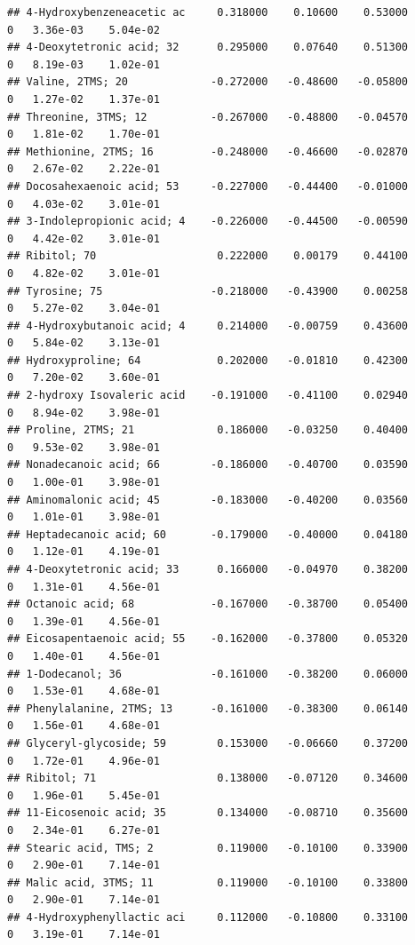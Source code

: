 \documentclass[]{article}
\begin{document}
\begin{verbatim}
## 4-Hydroxybenzeneacetic ac     0.318000    0.10600    0.53000         0   3.36e-03    5.04e-02
## 4-Deoxytetronic acid; 32      0.295000    0.07640    0.51300         0   8.19e-03    1.02e-01
## Valine, 2TMS; 20             -0.272000   -0.48600   -0.05800         0   1.27e-02    1.37e-01
## Threonine, 3TMS; 12          -0.267000   -0.48800   -0.04570         0   1.81e-02    1.70e-01
## Methionine, 2TMS; 16         -0.248000   -0.46600   -0.02870         0   2.67e-02    2.22e-01
## Docosahexaenoic acid; 53     -0.227000   -0.44400   -0.01000         0   4.03e-02    3.01e-01
## 3-Indolepropionic acid; 4    -0.226000   -0.44500   -0.00590         0   4.42e-02    3.01e-01
## Ribitol; 70                   0.222000    0.00179    0.44100         0   4.82e-02    3.01e-01
## Tyrosine; 75                 -0.218000   -0.43900    0.00258         0   5.27e-02    3.04e-01
## 4-Hydroxybutanoic acid; 4     0.214000   -0.00759    0.43600         0   5.84e-02    3.13e-01
## Hydroxyproline; 64            0.202000   -0.01810    0.42300         0   7.20e-02    3.60e-01
## 2-hydroxy Isovaleric acid    -0.191000   -0.41100    0.02940         0   8.94e-02    3.98e-01
## Proline, 2TMS; 21             0.186000   -0.03250    0.40400         0   9.53e-02    3.98e-01
## Nonadecanoic acid; 66        -0.186000   -0.40700    0.03590         0   1.00e-01    3.98e-01
## Aminomalonic acid; 45        -0.183000   -0.40200    0.03560         0   1.01e-01    3.98e-01
## Heptadecanoic acid; 60       -0.179000   -0.40000    0.04180         0   1.12e-01    4.19e-01
## 4-Deoxytetronic acid; 33      0.166000   -0.04970    0.38200         0   1.31e-01    4.56e-01
## Octanoic acid; 68            -0.167000   -0.38700    0.05400         0   1.39e-01    4.56e-01
## Eicosapentaenoic acid; 55    -0.162000   -0.37800    0.05320         0   1.40e-01    4.56e-01
## 1-Dodecanol; 36              -0.161000   -0.38200    0.06000         0   1.53e-01    4.68e-01
## Phenylalanine, 2TMS; 13      -0.161000   -0.38300    0.06140         0   1.56e-01    4.68e-01
## Glyceryl-glycoside; 59        0.153000   -0.06660    0.37200         0   1.72e-01    4.96e-01
## Ribitol; 71                   0.138000   -0.07120    0.34600         0   1.96e-01    5.45e-01
## 11-Eicosenoic acid; 35        0.134000   -0.08710    0.35600         0   2.34e-01    6.27e-01
## Stearic acid, TMS; 2          0.119000   -0.10100    0.33900         0   2.90e-01    7.14e-01
## Malic acid, 3TMS; 11          0.119000   -0.10100    0.33800         0   2.90e-01    7.14e-01
## 4-Hydroxyphenyllactic aci     0.112000   -0.10800    0.33100         0   3.19e-01    7.14e-01

\end{verbatim}
\end{document}
